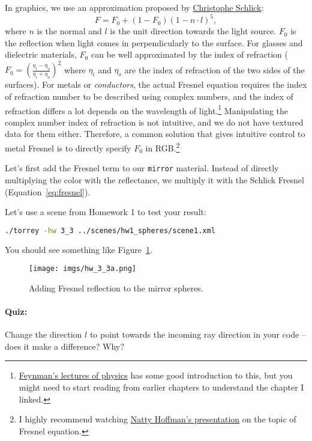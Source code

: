 In graphics, we use an approximation proposed by \href{https://en.wikipedia.org/wiki/Schlick%27s_approximation}{Christophe Schlick}:
\begin{equation}
F = F_0 + (1 - F_0) \left(1 - n \cdot l\right)^5,
\label{eq:fresnel}
\end{equation}
where $n$ is the normal and $l$ is the unit direction towards the light source. $F_0$ is the reflection when light comes in perpendicularly to the surface. For glasses and dielectric materials, $F_0$ can be well approximated by the index of refraction ($F_0 = \left(\frac{\eta_i - \eta_o}{\eta_i + \eta_o}\right)^2$ where $\eta_i$ and $\eta_o$ are the index of refraction of the two sides of the surfaces). For metals or \emph{conductors}, the actual Fresnel equation requires the index of refraction number to be described using complex numbers, and the index of refraction differs a lot depends on the wavelength of light.\footnote{\href{https://www.feynmanlectures.caltech.edu/I_31.html}{Feynman's lectures of physics} has some good introduction to this, but you might need to start reading from earlier chapters to understand the chapter I linked.} Manipulating the complex number index of refraction is not intuitive, and we do not have textured data for them either. Therefore, a common solution that gives intuitive control to metal Fresnel is to directly specify $F_0$ in RGB.\footnote{I highly recommend watching \href{https://www.youtube.com/watch?v=kEcDbl7eS0w}{Natty Hoffman's presentation} on the topic of Fresnel equation.}

Let's first add the Fresnel term to our \lstinline{mirror} material. Instead of directly multiplying the color with the reflectance, we multiply it with the Schlick Fresnel (Equation~\eqref{eq:fresnel}). 

Let's use a scene from Homework 1 to test your result:
\begin{lstlisting}[language=bash]
./torrey -hw 3_3 ../scenes/hw1_spheres/scene1.xml
\end{lstlisting}

You should see something like Figure~\ref{fig:hw_3_3_fresnel}.

\begin{figure}[ht]
    \centering
    \texttt{[image: imgs/hw\_3\_3a.png]}
    \caption{Adding Fresnel reflection to the mirror spheres.}
    \label{fig:hw_3_3_fresnel}
\end{figure}

\paragraph{Quiz:} Change the direction $l$ to point towards the incoming ray direction in your code -- does it make a difference? Why?

